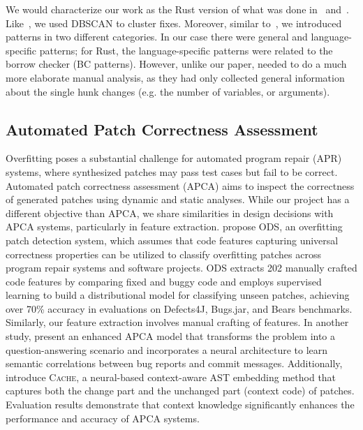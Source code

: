 We would characterize our work as the Rust version of what was done in~\cite{hanam2016discovering} and~\cite{yang2022mining}. Like~\cite{hanam2016discovering}, we used DBSCAN to cluster fixes. Moreover, similar to~\cite{yang2022mining}, we introduced patterns in two different categories. In our case there were general and language-specific patterns; for Rust, the language-specific patterns were related to the borrow checker (BC patterns). However, unlike our paper, \cite{yang2022mining} needed to do a much more elaborate manual analysis, as they had only collected general information about the single hunk changes (e.g. the number of variables, or arguments).

\subsection{Automated Patch Correctness Assessment}

Overfitting poses a substantial challenge for automated program repair (APR) systems, where synthesized patches may pass test cases but fail to be correct. Automated patch correctness assessment (APCA) aims to inspect the correctness of generated patches using dynamic and static analyses. While our project has a different objective than APCA, we share similarities in design decisions with APCA systems, particularly in feature extraction. \cite{ye2021automated} propose ODS, an overfitting patch detection system, which assumes that code features capturing universal correctness properties can be utilized to classify overfitting patches across program repair systems and software projects. ODS extracts 202 manually crafted code features by comparing fixed and buggy code and employs supervised learning to build a distributional model for classifying unseen patches, achieving over 70\% accuracy in evaluations on Defects4J, Bugs.jar, and Bears benchmarks. Similarly, our feature extraction involves manual crafting of features. In another study, \cite{tian2022change} present an enhanced APCA model that transforms the problem into a question-answering scenario and incorporates a neural architecture to learn semantic correlations between bug reports and commit messages. Additionally, \cite{lin2022context} introduce \textsc{Cache}, a neural-based context-aware AST embedding method that captures both the change part and the unchanged part (context code) of patches. Evaluation results demonstrate that context knowledge significantly enhances the performance and accuracy of APCA systems.


